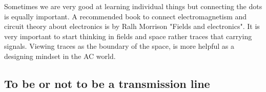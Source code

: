 \documentclass[12pt]{article}
\begin{document}



Sometimes we are very good at learning individual things but connecting the dots is equally important. A recommended book to connect electromagnetism and circuit theory about electronics is by Ralh Morrison "Fields and electronics". It is very important to start thinking in fields and space rather traces that carrying signals. Viewing traces as the boundary of the space, is more helpful as a designing mindset in the AC world.


\subsection{To be or not to be a transmission line}
\end{document}
